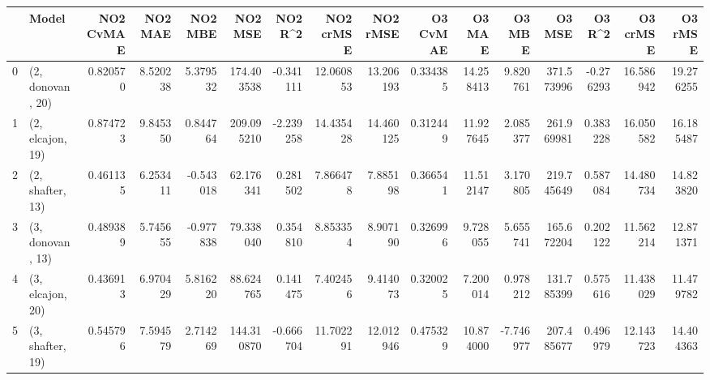 \begin{tabular}{llrrrrrrrrrrrrrr}
\toprule
{} &             Model &  NO2 CvMAE &   NO2 MAE &   NO2 MBE &     NO2 MSE &   NO2 R\textasciicircum2 &  NO2 crMSE &   NO2 rMSE &  O3 CvMAE &     O3 MAE &    O3 MBE &      O3 MSE &    O3 R\textasciicircum2 &   O3 crMSE &    O3 rMSE \\
\midrule
0 &  (2, donovan, 20) &   0.820570 &  8.520238 &  5.379532 &  174.403538 & -0.341111 &  12.060853 &  13.206193 &  0.334385 &  14.258413 &  9.820761 &  371.573996 & -0.276293 &  16.586942 &  19.276255 \\
1 &  (2, elcajon, 19) &   0.874723 &  9.845350 &  0.844764 &  209.095210 & -2.239258 &  14.435428 &  14.460125 &  0.312449 &  11.927645 &  2.085377 &  261.969981 &  0.383228 &  16.050582 &  16.185487 \\
2 &  (2, shafter, 13) &   0.461135 &  6.253411 & -0.543018 &   62.176341 &  0.281502 &   7.866478 &   7.885198 &  0.366541 &  11.512147 &  3.170805 &  219.745649 &  0.587084 &  14.480734 &  14.823820 \\
3 &  (3, donovan, 13) &   0.489389 &  5.745655 & -0.977838 &   79.338040 &  0.354810 &   8.853354 &   8.907190 &  0.326996 &   9.728055 &  5.655741 &  165.672204 &  0.202122 &  11.562214 &  12.871371 \\
4 &  (3, elcajon, 20) &   0.436913 &  6.970429 &  5.816220 &   88.624765 &  0.141475 &   7.402456 &   9.414073 &  0.320025 &   7.200014 &  0.978212 &  131.785399 &  0.575616 &  11.438029 &  11.479782 \\
5 &  (3, shafter, 19) &   0.545796 &  7.594579 &  2.714269 &  144.310870 & -0.666704 &  11.702291 &  12.012946 &  0.475329 &  10.874000 & -7.746977 &  207.485677 &  0.496979 &  12.143723 &  14.404363 \\
\bottomrule
\end{tabular}
